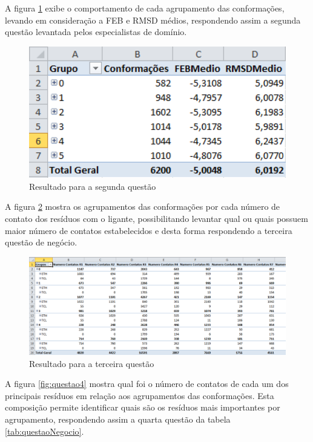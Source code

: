 A figura \ref{fig:questao2} exibe o comportamento de cada agrupamento das conformações, levando em consideração a FEB e RMSD médios, respondendo assim a segunda questão levantada pelos especialistas de domínio.

\begin{figure}[h]
        \center
        \includegraphics[width=14cm]{images/Questao2.PNG}
        \caption{Resultado para a segunda questão}
        \label{fig:questao2}
\end{figure}

A figura \ref{fig:questao3} mostra os agrupamentos das conformações por cada número de contato dos resíduos com o ligante, possibilitando levantar qual ou quais possuem maior número de contatos estabelecidos e desta forma respondendo a terceira questão de negócio. 

\begin{figure}[h]
        \center
        \includegraphics[width=14cm]{images/Questao3.PNG}
        \caption{Resultado para a terceira questão}
        \label{fig:questao3}
\end{figure}

A figura \ref{fig:questao4} mostra qual foi o número de contatos de cada um dos principais resíduos em relação aos agrupamentos das conformações. Esta composição permite identificar quais são os resíduos mais importantes por agrupamento, respondendo assim a quarta questão da tabela \ref{tab:questaoNegocio}.

